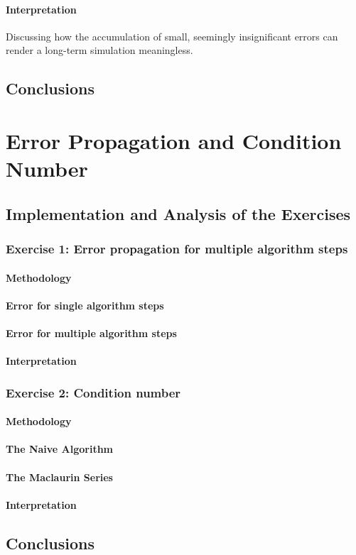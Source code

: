 \paragraph{Interpretation} Discussing how the accumulation of small, seemingly insignificant errors can render a long-term simulation meaningless.

\subsection{Conclusions}

\section{Error Propagation and Condition Number}

\subsection{Implementation and Analysis of the Exercises}

\subsubsection{Exercise 1: Error propagation for multiple algorithm steps}

\paragraph{Methodology}
\paragraph{Error for single algorithm steps}
\paragraph{Error for multiple algorithm steps}
\paragraph{Interpretation}

\subsubsection{Exercise 2: Condition number}

\paragraph{Methodology}
\paragraph{The Naive Algorithm}
\paragraph{The Maclaurin Series}
\paragraph{Interpretation}

\subsection{Conclusions}

